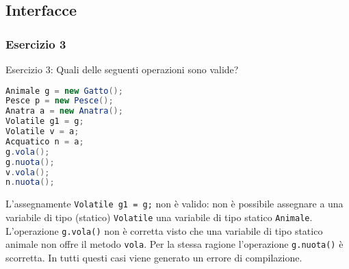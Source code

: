 \documentclass{article}
\begin{document}
\subsection{Interfacce}
\subsubsection{Esercizio 3}
\begin{framed}
Esercizio 3: Quali delle seguenti operazioni sono valide?
\end{framed}

\begin{lstlisting}[language=Java,escapechar=|]
Animale g = new Gatto(); 
Pesce p = new Pesce(); 
Anatra a = new Anatra(); 
Volatile g1 = g; 
Volatile v = a; 
Acquatico n = a;
g.vola();
g.nuota();
v.vola();
n.nuota();
\end{lstlisting}
L'assegnamente \texttt{Volatile g1 = g;} non \`e valido: non \`e possibile assegnare a una variabile di tipo (statico) \texttt{Volatile} una variabile di tipo statico \texttt{Animale}. L'operazione \texttt{g.vola()} non \`e corretta visto che una variabile di tipo statico animale non offre il metodo \texttt{vola}. Per la stessa ragione l'operazione \texttt{g.nuota()} \`e scorretta. In tutti questi casi viene generato un errore di compilazione.









\clearpage







\nocite{*}
\end{document}
